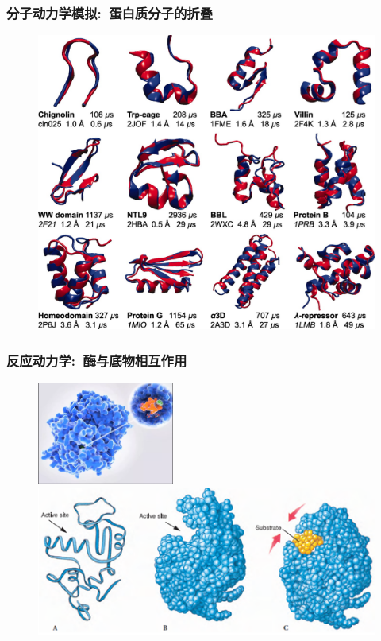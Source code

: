 \frame
{
	\frametitle{分子动力学模拟:~蛋白质分子的折叠}
\begin{figure}[h!]
\centering
\vspace{-13.5pt}
\includegraphics[height=0.75\textwidth,width=1.0\textwidth,viewport=0 0 1290 1130,clip]{Figures/Protein-folding.jpeg}
\label{Protein-folding}
\end{figure}
}

\frame
{
	\frametitle{反应动力学:~酶与底物相互作用}
\begin{figure}[h!]
\centering
\vspace{-10.5pt}
\includegraphics[height=0.30\textwidth,width=0.4\textwidth,viewport=0 0 880 600,clip]{Figures/Active_site_model.png}
\includegraphics[height=0.37\textwidth,width=1.0\textwidth,viewport=0 0 460 200,clip]{Figures/enzyme-substrate-2.png}
\label{enzyme-substrate}
\end{figure}
}


